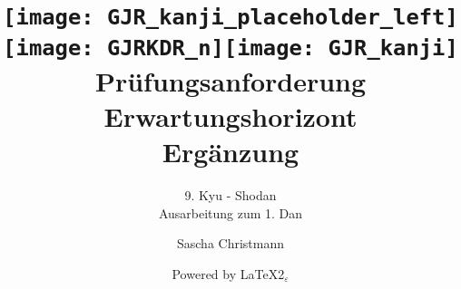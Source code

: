 	\title{\texttt{[image: GJR\_kanji\_placeholder\_left]}\quad\texttt{[image: GJRKDR\_n]}\quad\texttt{[image: GJR\_kanji]}\rmfamily\\Prüfungsanforderung\\Erwartungshorizont\\Ergänzung}
	\author{\sffamily Sascha Christmann\and\sffamily Powered by \rmfamily\LaTeX 2$_{\varepsilon}$}
	\subtitle{9. Kyu - Shodan\\Ausarbeitung zum 1. Dan}
	\begin{titlepage}
		\maketitle
	\end{titlepage}
